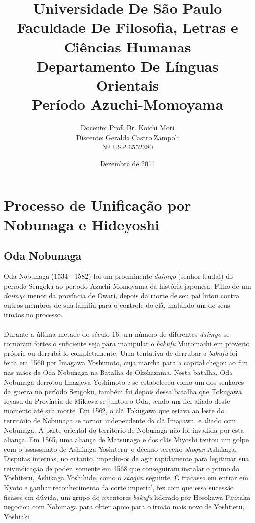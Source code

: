 \documentclass[12pt, a4paper]{article}
\title{Universidade De São Paulo\\
    Faculdade De Filosofia, Letras e Ciências Humanas\\
    Departamento De Línguas Orientais\\
    \vspace{3cm}
    \textbf{\Huge{Período Azuchi-Momoyama}}\\
    \vspace{4cm}}
\author{Docente: Prof. Dr. Koichi Mori\\
    Discente: Geraldo Castro Zampoli\\
    Nº USP 6552380}
\date{Dezembro de 2011}
\begin{document}
    \maketitle
    \newpage
    
    \section {Processo de Unificação por Nobunaga e Hideyoshi}
        \subsection {Oda Nobunaga}
            Oda Nobunaga (1534 - 1582) foi um proeminente \textit{daimyo} (senhor feudal) do período Sengoku ao período Azuchi-Momoyama da história japonesa. Filho de um \textit{daimyo} menor da província de Owari, depois da morte de seu pai lutou contra outros membros de sua família para o controle do clã, matando um de seus irmãos no processo.\\
            \\
            \indent Durante a última metade do século 16, um número de diferentes \textit{daimyo} se tornoram fortes o suficiente seja para manipular o \textit{bakufu} Muromachi em proveito próprio ou derrubá-lo completamente. Uma tentativa de derrubar o \textit{bakufu} foi feita em 1560 por Imagawa Yoshimoto, cuja marcha para a capital chegou ao fim nas mãos de Oda Nobunaga na Batalha de Okehazama. Nesta batalha, Oda Nobunaga derrotou Imagawa Yoshimoto e se estabeleceu como um dos senhores da guerra no período Sengoku, também foi depois dessa batalha que Tokugawa Ieyasu da Província de Mikawa se juntou o Oda, sendo um fiel aliado deste momento até sua morte. Em 1562, o clã Tokugawa que estava ao leste do território de Nobunaga se tornou independente do clã Imagawa, e aliado com Nobunaga. A parte oriental do território de Nobunaga não foi invadida por esta aliança. Em 1565, uma aliança de Matsunaga e dos clãs Miyoshi tentou um golpe com o assassinato de Ashikaga Yoshiteru, o décimo terceiro \textit{shogun} Ashikaga. Disputas internas, no entanto, impediu-os de agir rapidamente para legitimar sua reivindicação de poder, somente em 1568 que conseguiram instalar o primo do Yoshiteru, Ashikaga Yoshihide, como o \textit{shogun} seguinte. O fracasso em entrar em Kyoto e ganhar reconhecimento da corte imperial, fez com que essa sucessão ficasse em dúvida, um grupo de retentores \textit{bakufu} liderado por Hosokawa Fujitaka negociou com Nobunaga para obter apoio para o irmão mais novo de Yoshiteru, Yoshiaki.\\
\end{document}
